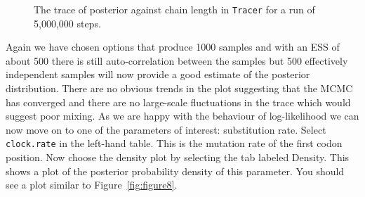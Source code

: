 \documentclass[cup7b, english]{cupbook}
\begin{document}
\begin{figure}[htbp]
\begin{center}
\leavevmode
{}
\end{center}
\caption{The trace of posterior against chain length in \texttt{Tracer} for a run of 5,000,000 steps.}
\label{fig:figure7}
\end{figure}

Again we have chosen options that produce 1000 samples and with an ESS
of about 500 there is still auto-correlation between the samples but 500 effectively independent
samples will now provide a good estimate of the posterior distribution. There are no obvious trends
in the plot suggesting that the MCMC has converged and there are no large-scale fluctuations in the 
trace which would suggest poor mixing.
As we are happy with the behaviour of log-likelihood we can now move on to one of the
parameters of interest: substitution rate. Select \texttt{clock.rate} in the left-hand table. This
is the mutation rate of the first codon position. Now choose the density plot by selecting
the tab labeled Density. This shows a plot of the posterior probability density of this
parameter. You should see a plot similar to Figure~\ref{fig:figure8}.
\end{document}

